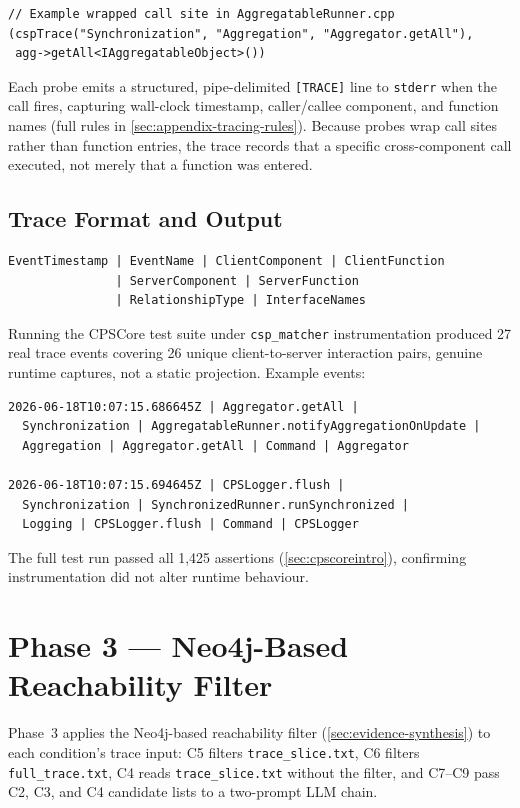 \begin{verbatim}
// Example wrapped call site in AggregatableRunner.cpp
(cspTrace("Synchronization", "Aggregation", "Aggregator.getAll"),
 agg->getAll<IAggregatableObject>())
\end{verbatim}

Each probe emits a structured, pipe-delimited \texttt{[TRACE]} line to
\texttt{stderr} when the call fires, capturing wall-clock timestamp,
caller/callee component, and function names (full rules in
\cref{sec:appendix-tracing-rules}). Because probes wrap call sites
rather than function entries, the trace records that a specific
cross-component call executed, not merely that a function was entered.

\subsection{Trace Format and Output}

\begin{verbatim}
EventTimestamp | EventName | ClientComponent | ClientFunction
               | ServerComponent | ServerFunction
               | RelationshipType | InterfaceNames
\end{verbatim}

Running the CPSCore test suite under \texttt{csp\_matcher} instrumentation
produced 27 real trace events covering 26 unique client-to-server
interaction pairs, genuine runtime captures, not a static projection.
Example events:

\begin{verbatim}
2026-06-18T10:07:15.686645Z | Aggregator.getAll |
  Synchronization | AggregatableRunner.notifyAggregationOnUpdate |
  Aggregation | Aggregator.getAll | Command | Aggregator

2026-06-18T10:07:15.694645Z | CPSLogger.flush |
  Synchronization | SynchronizedRunner.runSynchronized |
  Logging | CPSLogger.flush | Command | CPSLogger
\end{verbatim}

The full test run passed all 1,425 assertions (\cref{sec:cpscoreintro}),
confirming instrumentation did not alter runtime behaviour.

\section{Phase 3 --- Neo4j-Based Reachability Filter}\label{sec:synthesis-impl}

Phase~3 applies the Neo4j-based reachability filter
(\cref{sec:evidence-synthesis}) to each condition's trace input:
C5 filters \texttt{trace\_slice.txt}, C6 filters
\texttt{full\_trace.txt}, C4 reads \texttt{trace\_slice.txt} without
the filter, and C7--C9 pass C2, C3, and C4 candidate lists to a
two-prompt \ac{LLM} chain.

